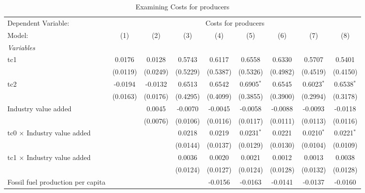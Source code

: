 
\begin{table}[htbp]
   \caption{Examining Costs for producers}
   \centering
   \begin{tabular}{lcccccccc}
      \tabularnewline \midrule \midrule
      Dependent Variable: & \multicolumn{8}{c}{Costs for producers}\\
      Model:                                  & (1)      & (2)      & (3)      & (4)      & (5)          & (6)      & (7)          & (8)\\  
      \midrule
      \emph{Variables}\\
      tc1                                     & 0.0176   & 0.0128   & 0.5743   & 0.6117   & 0.6558       & 0.6330   & 0.5707       & 0.5401\\   
                                              & (0.0119) & (0.0249) & (0.5229) & (0.5387) & (0.5326)     & (0.4982) & (0.4519)     & (0.4150)\\   
      tc2                                     & -0.0194  & -0.0132  & 0.6513   & 0.6542   & 0.6905$^{*}$ & 0.6545   & 0.6023$^{*}$ & 0.6538$^{*}$\\   
                                              & (0.0163) & (0.0176) & (0.4295) & (0.4099) & (0.3855)     & (0.3900) & (0.2994)     & (0.3178)\\   
      Industry value added                    &          & 0.0045   & -0.0070  & -0.0045  & -0.0058      & -0.0088  & -0.0093      & -0.0118\\   
                                              &          & (0.0076) & (0.0106) & (0.0116) & (0.0117)     & (0.0111) & (0.0113)     & (0.0116)\\   
      tc0 $\times$ Industry value added       &          &          & 0.0218   & 0.0219   & 0.0231$^{*}$ & 0.0221   & 0.0210$^{*}$ & 0.0221$^{*}$\\   
                                              &          &          & (0.0144) & (0.0137) & (0.0129)     & (0.0130) & (0.0104)     & (0.0109)\\   
      tc1 $\times$ Industry value added       &          &          & 0.0036   & 0.0020   & 0.0021       & 0.0012   & 0.0013       & 0.0038\\   
                                              &          &          & (0.0124) & (0.0127) & (0.0124)     & (0.0128) & (0.0132)     & (0.0128)\\   
      Fossil fuel production per capita       &          &          &          & -0.0156  & -0.0163      & -0.0141  & -0.0137      & -0.0160\\   

\end{tabular}
\end{table}
